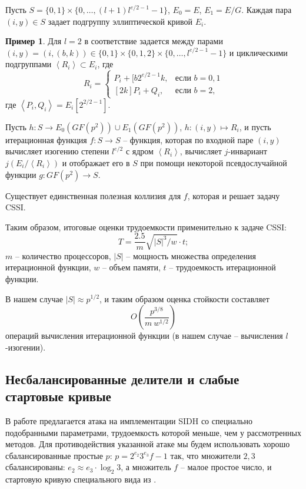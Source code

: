 \documentclass[a4paper,12pt]{article}
\newcommand{\tr}[1]{\left\langle #1\right\rangle}
\theoremstyle{definition}
\newtheorem{example}{Пример}
\begin{document}
Пусть $S=\{0,1\}\times\{0,\dots,(l+1)l^{e/2-1}-1\}$, $E_0=E$, $E_1=E/G$.  Каждая пара $(i,y)\in S$ задает подгруппу эллиптической кривой $E_i$. 
\begin{example}
 Для $l=2$ в \cite{Adj} соответствие задается между парами $(i,y)=(i,(b,k))\in\{0,1\}\times\{0,1,2\}\times \{0,\dots,l^{e/2-1}-1\}$ и 
 циклическими подгруппами $\tr{R_i}\subset E_i$, где
 \begin{equation*}
R_i = 
 \begin{cases}
   P_i+[b2^{e/2-1}k,  &\text{если } b=0,1 \\
   [2k]P_i+Q_i,  &\text{если } b=2,
 \end{cases}
\end{equation*}
где $\tr{P_i,Q_i} = E_i[2^{2/2-1}]$.
\end{example}

Пусть $h:S\to E_0(GF(p^2))\cup E_1(GF(p^2))$, $h:(i,y)\mapsto R_i$, и  пусть итерационная функция $f:S\to S$ -- функция, которая по входной паре $(i,y)$
вычисляет изогению степени $l^{e/2}$ с ядром $\tr{R_i}$, вычисляет $j$-инвариант $j(E_i/\tr{R_i})$ и отображает его в $S$ при помощи некоторой псевдослучайной
функции $g: GF(p^2)\to S$.

Существует единственная полезная коллизия для $f$, которая и решает задачу CSSI.

Таким образом, итоговые оценки трудоемкости применительно к задаче CSSI:
\begin{equation}\label{eq1}
T=\frac{2.5}{m}\sqrt{|S|^3/w}\cdot t;
\end{equation}
$m$ -- количество процессоров, $|S|$ -- мощность множества определения итерационной функции, $w$ -- объем памяти, $t$ -- трудоемкость итерационной функции.

В нашем случае $|S|\approx p^{1/2}$, и таким образом оценка стойкости составляет
\begin{equation}\label{eq2} 
O\left(\frac{p^{3/8}}{m\ w^{1/2}}\right)
\end{equation}
операций вычисления итерационной функции (в нашем случае -- вычисления $l$-изогении).

\subsection*{Несбалансированные делители и слабые стартовые кривые}


В работе \cite{Kutas} предлагается атака на имплементации SIDH со специально  подобранными параметрами, трудоемкость которой меньше, чем у рассмотренных методов.
Для противодействия указанной атаке мы будем использовать хорошо сбалансированные простые $p$: $p=2^{e_2}3^{e_3}f-1$ так, что множители $2,3$ сбалансированы: 
$e_2\approx e_3 \cdot \log_2 3$, а множитель $f$ -- малое простое число,
и стартовую кривую специального вида из \cite{StartingCurve}.
\end{document}
